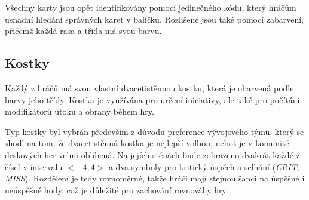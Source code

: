 Všechny karty jsou opět identifikovány pomocí jedinečného kódu, který hráčům usnadní hledání správných karet v balíčku. Rozlišené jsou také pomocí zabarvení, přičemž každá rasa a třída má svou barvu.

\subsection{Kostky}
\label{subsec:design_dice}

Každý z hráčů má svou vlastní dvacetistěnnou kostku, která je obarvená podle barvy jeho třídy. Kostka je využívána pro určení iniciativy, ale také pro počítání modifikátorů útoku a obrany během hry.

Typ kostky byl vybrán především z důvodu preference vývojového týmu, který se shodl na tom, že dvacetistěnná kostka je nejlepší volbou, neboť je v komunitě deskových her velmi oblíbená. Na jejích stěnách bude zobrazeno dvakrát každé z čísel v intervalu $<-4, 4>$ a dva symboly pro kritický úspěch a selhání (\textit{CRIT}, \textit{MISS}). Rozdělení je tedy rovnoměrné, takže hráči mají stejnou šanci na úspěšné i neúspěšné hody, což je důležité pro zachování rovnováhy hry.
